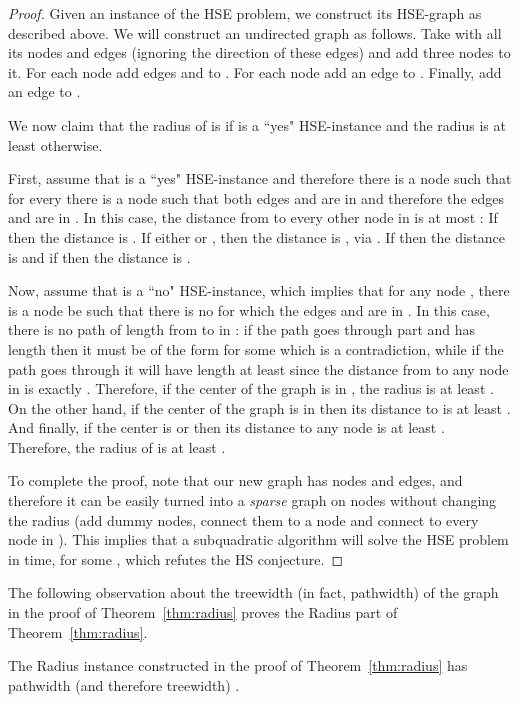 \begin{proof}
Given an instance  of the HSE problem, we construct its HSE-graph  as described above.
We will construct an undirected graph  as follows.
Take  with all its nodes and edges (ignoring the direction of these edges) and add three nodes  to it.
For each node  add edges  and  to .
For each node  add an edge  to .
Finally, add an edge  to .

We now claim that the radius of  is  if  is a ``yes" HSE-instance and the radius is at least  otherwise.

First, assume that  is a ``yes" HSE-instance and therefore there is a node  such that for every  there is a node  such that both edges  and  are in  and therefore the edges  and  are in .
In this case, the distance from  to every other node  in  is at most :
If  then the distance is .
If either  or , then the distance is , via .
If  then the distance is  and if  then the distance is .

Now, assume that  is a ``no" HSE-instance, which implies that for any node , there is a node  be such that there is no  for which the edges  and  are in . 
In this case, there is no path of length  from  to  in : if the path goes through part  and has length  then it must be of the form  for some  which is a contradiction, while if the path goes through  it will have length at least  since the distance from  to any node in  is exactly .
Therefore, if the center of the graph is in , the radius is at least .
On the other hand, if the center of the graph is in  then its distance to  is at least . 
And finally, if the center is  or  then its distance to any node  is at least .
Therefore, the radius of  is at least .

To complete the proof, note that our new graph  has  nodes and  edges, and therefore it can be easily turned into a \emph{sparse} graph on  nodes without changing the radius (add  dummy nodes, connect them to a node  and connect  to every node in ). This implies that a subquadratic algorithm will solve the HSE problem in  time, for some , which refutes the HS conjecture. 

\end{proof}

The following observation about the treewidth (in fact, pathwidth) of the graph in the proof of Theorem~\ref{thm:radius} proves the Radius part of Theorem~\ref{thm:radius}.

\begin{claim}
The Radius instance constructed in the proof of Theorem~\ref{thm:radius} has pathwidth (and therefore treewidth) .
\end{claim}

